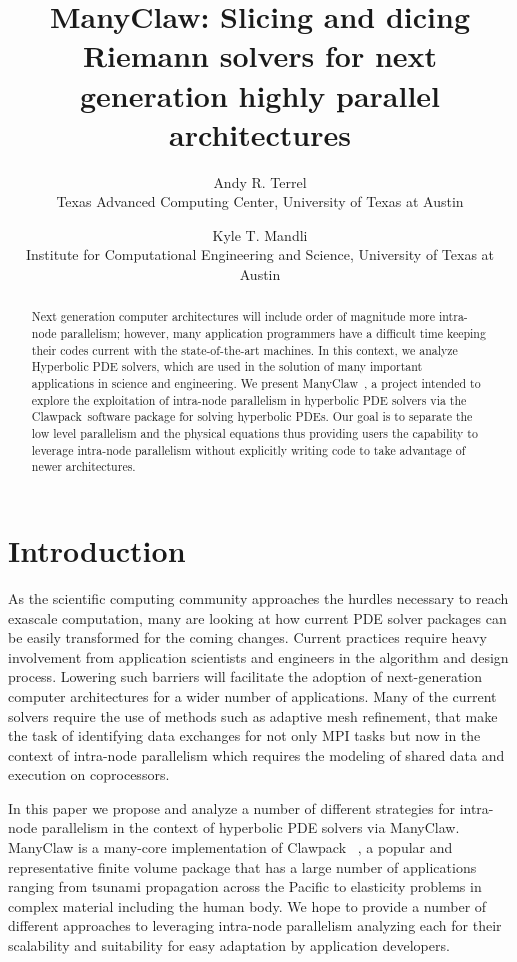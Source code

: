 \documentclass{article}
\title{ManyClaw:
Slicing and dicing Riemann solvers for next generation highly parallel architectures}
\author{
Andy R. Terrel \\
Texas Advanced Computing Center, University of Texas at Austin
\and
Kyle T. Mandli \\
Institute for Computational Engineering and Science, University of Texas at Austin
}
\date{}
\def\clawpack{Clawpack~}
\def\manyclaw{ManyClaw~}
\begin{document}
\maketitle

\let\thefootnote\relax{}

\begin{abstract}
     Next generation computer
    architectures will include order of magnitude more intra-node parallelism; however, many
    application programmers have a difficult time keeping their codes current
    with the state-of-the-art machines. In this context, we analyze Hyperbolic
    PDE solvers, which are used in the solution of many important
    applications in science and engineering. We present \manyclaw, a project
    intended to explore the exploitation of intra-node parallelism in hyperbolic
    PDE solvers via the \clawpack software package for solving hyperbolic PDEs.
    Our goal is to separate the low level parallelism and the physical
    equations thus providing users the capability to
    leverage intra-node parallelism without explicitly writing code to
    take advantage of newer architectures.
\end{abstract}

\section{Introduction}
As the scientific computing community approaches the hurdles necessary to reach
exascale computation, many are looking at how current PDE solver packages can
be easily transformed for the coming changes. Current practices require heavy
involvement from application scientists and engineers in the algorithm and
design process. Lowering such barriers will facilitate the adoption of
next-generation computer architectures for a wider number of applications. Many
of the current solvers require the use of methods such as adaptive mesh
refinement, that make the task of identifying data exchanges for not only MPI
tasks but now in the context of intra-node parallelism which requires the
modeling of shared data and execution on coprocessors.

In this paper we propose and analyze a number of different strategies for
intra-node parallelism in the context of hyperbolic PDE solvers via
ManyClaw\cite{ManyClaw}. ManyClaw is a many-core implementation of \clawpack
\cite{Clawpack:tp}, a popular and representative finite volume package that has
a large number of applications ranging from tsunami propagation across the
Pacific to elasticity problems in complex material including the human body. We
hope to provide a number of different approaches to leveraging intra-node
parallelism analyzing each for their scalability and suitability for easy
adaptation by application developers.
\end{document}
